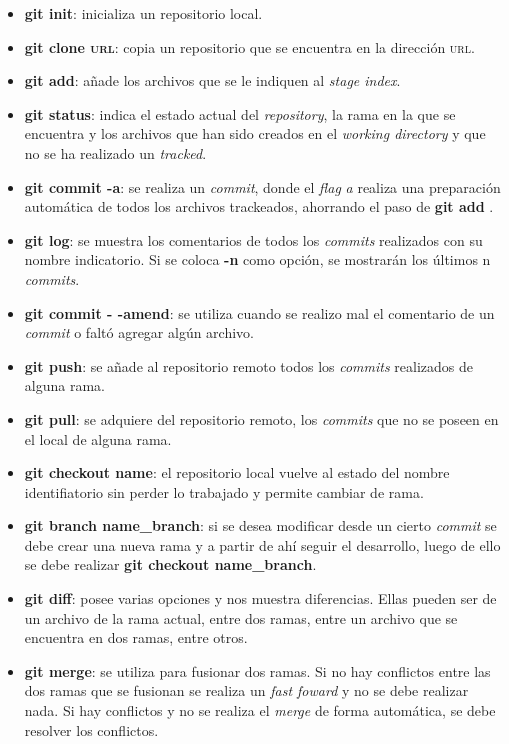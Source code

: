 \begin{itemize}
	\item \textbf{git init}: inicializa un repositorio local.
	\item \textbf{git clone \textsc{url}}: copia un repositorio que se encuentra en la dirección \textsc{url}.
	\item \textbf{git add}: añade los archivos que se le indiquen al \textit{stage index}. 
	\item \textbf{git status}: indica el estado actual del \textit{repository}, la rama en la que se encuentra y los archivos que han sido creados en el \textit{working directory} y que no se ha realizado un \textit{tracked}.
	\item \textbf{git commit -a}: se realiza un \textit{commit}, donde el \textit{flag} \textit{a} realiza una preparación automática de todos los archivos trackeados, ahorrando el paso de \textbf{git add} \cite{user:2020:git}.  
	\item \textbf{git log}: se muestra los comentarios de todos los \textit{commits} realizados con su nombre indicatorio. Si se coloca \textbf{-n} como opción, se mostrarán los últimos n \textit{commits}.
	\item \textbf{git commit - -amend}: se utiliza cuando se realizo mal el comentario de un \textit{commit} o faltó agregar algún archivo.
	\item \textbf{git push}: se añade al repositorio remoto todos los \textit{commits} realizados de alguna rama.
	\item \textbf{git pull}: se adquiere del repositorio remoto, los \textit{commits} que no se poseen en el local de alguna rama.
	\item \textbf{git checkout name}: el repositorio local vuelve al estado del nombre identifiatorio sin perder lo trabajado y permite cambiar de rama.
	\item \textbf{git branch name\_branch}: si se desea modificar desde un cierto \textit{commit} se debe crear una nueva rama y a partir de ahí seguir el desarrollo, luego de ello se debe realizar \textbf{git checkout name\_branch}.
	\item \textbf{git diff}: posee varias opciones y nos muestra diferencias. Ellas pueden ser de un archivo de la rama actual, entre dos ramas, entre un archivo que se encuentra en dos ramas, entre otros.
	\item \textbf{git merge}: se utiliza para fusionar dos ramas. Si no hay conflictos entre las dos ramas que se fusionan se realiza un \textit{fast foward} y no se debe realizar nada. Si hay conflictos y no se realiza el \textit{merge} de forma automática, se debe resolver los conflictos\footnotemark[3].
\end{itemize}


